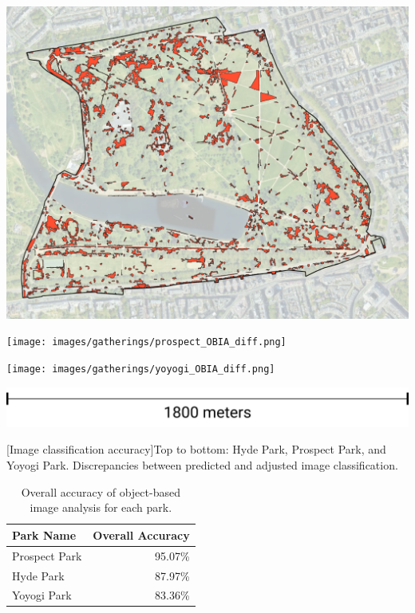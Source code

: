 \begin{multicols}{2}
\begin{minipage}{0.45\textwidth}
    \centering
    \includegraphics[width=\linewidth]{images/gatherings/hyde_OBIA_diff.png}\par\hspace{5pt} 
    \texttt{[image: images/gatherings/prospect\_OBIA\_diff.png]}\par\hspace{5pt} 
    \texttt{[image: images/gatherings/yoyogi\_OBIA\_diff.png]}\par\hspace{5pt} 
    \includegraphics[width=\linewidth]{images/gatherings/scale_legend.png}\par{}[Image classification accuracy]{Top to bottom: Hyde Park, Prospect Park, and Yoyogi Park. Discrepancies between predicted and adjusted image classification.}
    \label{fig:obia_diff}
\end{minipage}

\end{multicols}

\begin{table}[h]
      \centering
      \small
    \begin{tabular}{lr}
    \toprule
    Park Name &  Overall Accuracy \\
\midrule
Prospect Park &     95.07\% \\
Hyde Park &     87.97\% \\
Yoyogi Park &     83.36\% \\
    \bottomrule
    \end{tabular}
    \caption[Image classification accuracy table]{Overall accuracy of object-based image analysis for each park.}
    \label{table:global_OBIA}
\end{table}


